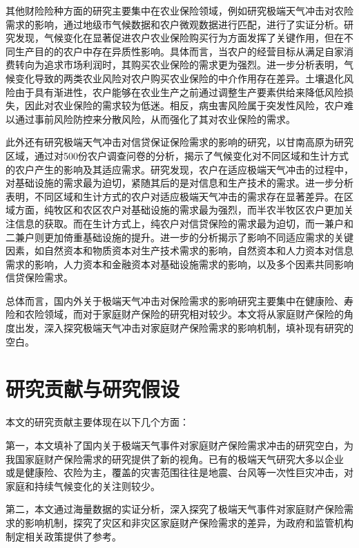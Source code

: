 其他财险险种方面的研究主要集中在农业保险领域，例如研究极端天气冲击对农险需求的影响\citep{胡新艳2021气候变化}，通过地级市气候数据和农户微观数据进行匹配，进行了实证分析。研究发现，气候变化在显著促进农户农业保险购买行为方面发挥了关键作用，但在不同生产目的的农户中存在异质性影响。具体而言，当农户的经营目标从满足自家消费转向为追求市场利润时，其购买农业保险的需求更为强烈。进一步分析表明，气候变化导致的两类农业风险对农户购买农业保险的中介作用存在差异。土壤退化风险由于具有渐进性，农户能够在农业生产之前通过调整生产要素供给来降低风险损失，因此对农业保险的需求较为低迷。相反，病虫害风险属于突发性风险，农户难以通过事前风险防控来分散风险，从而强化了其对农业保险的需求。

此外还有研究极端天气冲击对信贷保证保险需求的影响的研究\citep{张钦2017高寒生态脆弱区农户对气候变化的适应需求}，以甘南高原为研究区域，通过对500份农户调查问卷的分析，揭示了气候变化对不同区域和生计方式的农户产生的影响及其适应需求。研究发现，农户在适应极端天气冲击的过程中，对基础设施的需求最为迫切，紧随其后的是对信息和生产技术的需求。进一步分析表明，不同区域和生计方式的农户对适应极端天气冲击的需求存在显著差异。在区域方面，纯牧区和农区农户对基础设施的需求最为强烈，而半农半牧区农户更加关注信息的获取。而在生计方式上，纯农户对信贷保险的需求最为迫切，而一兼户和二兼户则更加倚重基础设施的提升。进一步的分析揭示了影响不同适应需求的关键因素，如自然资本和物质资本对生产技术需求的影响，自然资本和人力资本对信息需求的影响，人力资本和金融资本对基础设施需求的影响，以及多个因素共同影响信贷保险需求。

总体而言，国内外关于极端天气冲击对保险需求的影响研究主要集中在健康险、寿险和农险领域，而对于家庭财产保险的研究相对较少。本文将从家庭财产保险的角度出发，深入探究极端天气冲击对家庭财产保险需求的影响机制，填补现有研究的空白。

\section{研究贡献与研究假设}
本文的研究贡献主要体现在以下几个方面：

第一，本文填补了国内关于极端天气事件对家庭财产保险需求冲击的研究空白，为我国家庭财产保险需求的研究提供了新的视角。已有的极端天气研究大多以企业 \citep{0Do}或是健康险\citep{赵强2021空气污染对商业健康保险需求的影响}、农险\citep{胡新艳2021气候变化}为主，覆盖的灾害范围往往是地震、台风等一次性巨灾冲击，对家庭和持续气候变化的关注则较少。

第二，本文通过海量数据的实证分析，深入探究了极端天气事件对家庭财产保险需求的影响机制，探究了灾区和非灾区家庭财产保险需求的差异，为政府和监管机构制定相关政策提供了参考。

